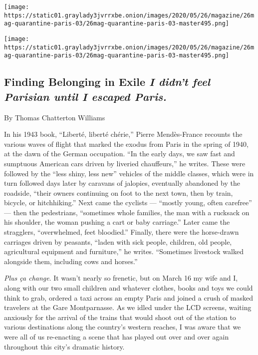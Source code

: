 \texttt{[image: https://static01.graylady3jvrrxbe.onion/images/2020/05/26/magazine/26mag-quarantine-paris-03/26mag-quarantine-paris-03-master495.png]}

\texttt{[image: https://static01.graylady3jvrrxbe.onion/images/2020/05/26/magazine/26mag-quarantine-paris-03/26mag-quarantine-paris-03-master495.png]}

\hypertarget{finding-belonging-in-exile-i-didnt-feel-parisian-until-i-escaped-paris}{%
\subsection{\texorpdfstring{Finding Belonging in Exile \emph{I didn't
feel Parisian until I escaped
Paris.}}{Finding Belonging in Exile I didn't feel Parisian until I escaped Paris.}}\label{finding-belonging-in-exile-i-didnt-feel-parisian-until-i-escaped-paris}}

By Thomas Chatterton Williams

In his 1943 book, ``Liberté, liberté chérie,'' Pierre Mendès-France
recounts the various waves of flight that marked the exodus from Paris
in the spring of 1940, at the dawn of the German occupation. ``In the
early days, we saw fast and sumptuous American cars driven by liveried
chauffeurs,'' he writes. These were followed by the ``less shiny, less
new'' vehicles of the middle classes, which were in turn followed days
later by caravans of jalopies, eventually abandoned by the roadside,
``their owners continuing on foot to the next town, then by train,
bicycle, or hitchhiking.'' Next came the cyclists --- ``mostly young,
often carefree'' --- then the pedestrians, ``sometimes whole families,
the man with a rucksack on his shoulder, the woman pushing a cart or
baby carriage.'' Later came the stragglers, ``overwhelmed, feet
bloodied.'' Finally, there were the horse-drawn carriages driven by
peasants, ``laden with sick people, children, old people, agricultural
equipment and furniture,'' he writes. ``Sometimes livestock walked
alongside them, including cows and horses.''

\emph{Plus ça change}. It wasn't nearly so frenetic, but on March 16 my
wife and I, along with our two small children and whatever clothes,
books and toys we could think to grab, ordered a taxi across an empty
Paris and joined a crush of masked travelers at the Gare Montparnasse.
As we idled under the LCD screens, waiting anxiously for the arrival of
the trains that would shoot out of the station to various destinations
along the country's western reaches, I was aware that we were all of us
re-enacting a scene that has played out over and over again throughout
this city's dramatic history.

